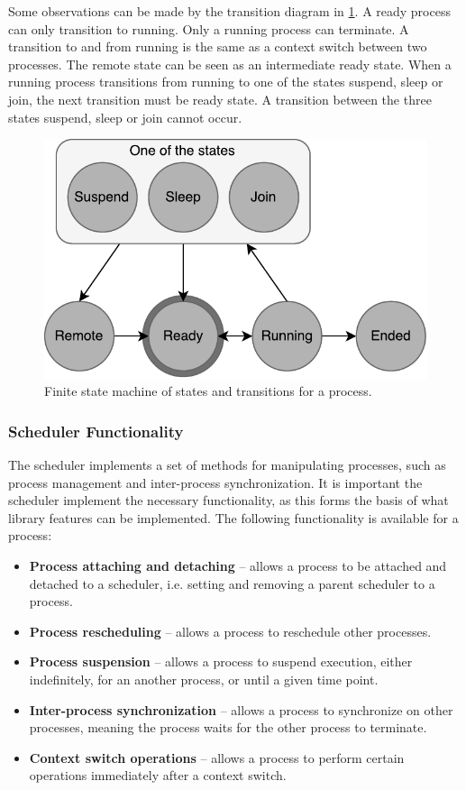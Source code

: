 Some observations can be made by the transition diagram in \cref{fig:context_states}. A ready process can only transition to running. Only a running process can terminate. A transition to and from running is the same as a context switch between two processes. The remote state can be seen as an intermediate ready state. When a running process transitions from running to one of the states suspend, sleep or join, the next transition must be ready state. A transition between the three states suspend, sleep or join cannot occur.

\begin{figure}[h!]
    \centering
    \includegraphics[width=0.7\linewidth]{fig/context_states}
    \caption{Finite state machine of states and transitions for a process.}
    \label{fig:context_states}
\end{figure}


\subsubsection{Scheduler Functionality}


The scheduler implements a set of methods for manipulating processes, such as process management and inter\hyp{}process synchronization. It is important the scheduler implement the necessary functionality, as this forms the basis of what library features can be implemented. The following functionality is available for a process:

\begin{itemize}[topsep=0em,itemsep=-1em,partopsep=0.5em,parsep=1em]
    \item \textbf{Process attaching and detaching} -- allows a process to be attached and detached to a scheduler, i.e. setting and removing a parent scheduler to a process.
    \item \textbf{Process rescheduling} -- allows a process to reschedule other processes.
    \item \textbf{Process suspension} -- allows a process to suspend execution, either indefinitely, for an another process, or until a given time point. 
    \item \textbf{Inter\hyp{}process synchronization} -- allows a process to synchronize on other processes, meaning the process waits for the other process to terminate.
    \item \textbf{Context switch operations} -- allows a process to perform certain operations immediately after a context switch.
\end{itemize}

